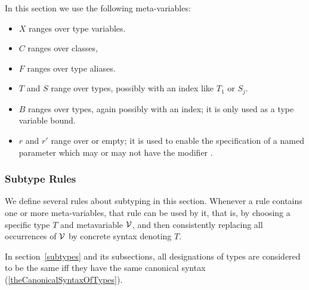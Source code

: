 \documentclass[makeidx]{article}
\begin{document}
\LMHash{}%
In this section we use the following meta-variables:

\begin{itemize}
\item $X$ ranges over type variables.
\item $C$ ranges over classes,
\item $F$ ranges over type aliases.
\item $T$ and $S$ range over types, possibly with an index like $T_1$ or $S_j$.
\item $B$ ranges over types, again possibly with an index;
  it is only used as a type variable bound.
\item $r$ and $r'$ range over \REQUIRED{} or empty;
  it is used to enable the specification of a named parameter
  which may or may not have the modifier \REQUIRED.
\end{itemize}


\subsubsection{Subtype Rules}

\LMHash{}%
We define several rules about subtyping in this section.
Whenever a rule contains one or more meta-variables,
that rule can be used by
it, that is, by choosing a specific type $T$ and metavariable $\cal V$,
and then consistently replacing all occurrences of $\cal V$ by
concrete syntax denoting $T$.


\LMHash{}%
In section~\ref{subtypes} and its subsections,
all designations of types are considered to be the same
if{}f they have the same canonical syntax
(\ref{theCanonicalSyntaxOfTypes}).
\end{document}
